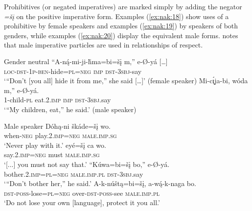 \documentclass[output=paper,colorlinks,citecolor=brown]{langscibook}
\begin{document}
Prohibitives (or negated imperatives) are marked simply by adding the negator \textit{=šį} on the positive imperative form. Examples (\ref{ex:nak:18}) show uses of a prohibitive by female speakers and examples (\ref{ex:nak:19}) by speakers of both genders, while examples (\ref{ex:nak:20}) display the equivalent male forms. \citet[332]{Cumberland2005} notes that male imperative particles are used in relationships of respect.


\ea\label{ex:nak:19}{Gender neutral}
    \ea\label{ex:nak:19a}
        \gll “A-n\'{ą}-mi-ji-ȟma=bi=šį m,” e-Ø-yá […] \\
             {\db}\textsc{loc}-\textsc{dst-1p-ben}-hide=\textsc{pl=neg} \textsc{imp} \textsc{dst-3sbj}-say \\
        \glt ‘“Don’t [you all] hide it from me,” she said […]’ (female speaker) \citep[53]{ParksDeMallie2012b}
    \ex\label{ex:nak:19b}
        \gll Mi-c\'{\k{ı}}ja-bi, wóda m,” e-Ø-yá. \\
             1-child-\textsc{pl} eat.2\textsc{.imp} \textsc{imp} \textsc{dst}-\textsc{3sbj.}say \\
        \glt ‘“My children, eat,” he said.’ (male speaker) \citep[87]{ParksDeMallie2012b}
    \z
\z

\ea\label{ex:nak:20}{Male speaker}
    \ea\label{ex:nak:20a}
        \gll Dóhą-ni škáde=šį wo. \\
             when-\textsc{neg} play.2.\textsc{imp}=\textsc{neg} \textsc{male.imp.sg} \\
        \glt ‘Never play with it.’ 
    \ex\label{ex:nak:20b}
        \gll […] eyé=šį ca wo. \\
             {} say.2.\textsc{imp=neg} must \textsc{male.imp.sg} \\ 
        \glt ‘[...] you must not say that.’ \citep[31]{ParksDeMallie2012b}
    \ex\label{ex:nak:20c}
        \gll “Kúwa=bi=šį bo,” e-Ø-yá. \\
             bother.2.\textsc{imp=pl=neg} \textsc{male.imp.pl} \textsc{dst}-\textsc{3sbj}.say \\
        \glt ‘“Don’t bother her,” he said.’ \citep[79]{ParksDeMallie2012b}
    \ex\label{ex:nak:20d}
        \gll A-k-núštą=bi=šį, a-w\'{ą}-k-naga bo. \\
             \textsc{dst-poss}-lose=\textsc{pl=neg} over\textsc{-dst-poss}-see \textsc{male.imp.pl}\\
        \glt ‘Do not lose your own [language], protect it you all.’
    \z
\z 
\end{document}
